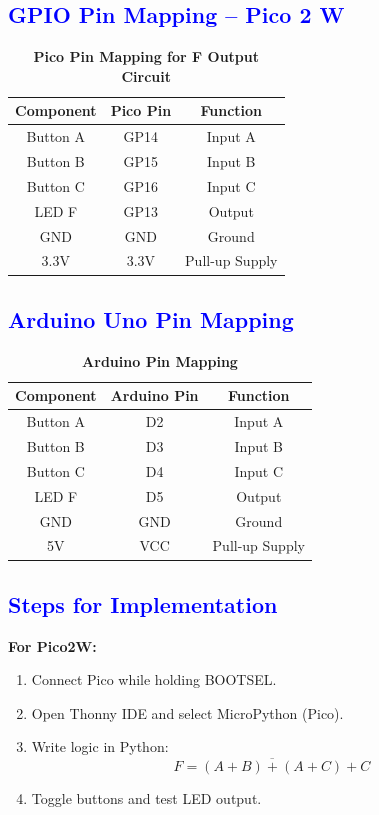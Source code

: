 \documentclass[twocolumn]{article}
\begin{document}
\subsection*{\textcolor{blue}{GPIO Pin Mapping – Pico 2 W}}

\begin{table}[h]
\centering
\renewcommand{\arraystretch}{1.3}
\begin{tabular}{|c|c|c|}
\hline
\textbf{Component} & \textbf{Pico Pin} & \textbf{Function} \\
\hline
Button A & GP14 & Input A \\
Button B & GP15 & Input B \\
Button C & GP16 & Input C \\
LED F & GP13 & Output \\
GND & GND & Ground \\
3.3V & 3.3V & Pull-up Supply \\
\hline
\end{tabular}
\caption*{\textbf{Pico Pin Mapping for F Output Circuit}}
\end{table}

\subsection*{\textcolor{blue}{Arduino Uno Pin Mapping}}

\begin{table}[h]
\centering
\renewcommand{\arraystretch}{1.3}
\begin{tabular}{|c|c|c|}
\hline
\textbf{Component} & \textbf{Arduino Pin} & \textbf{Function} \\
\hline
Button A & D2 & Input A \\
Button B & D3 & Input B \\
Button C & D4 & Input C \\
LED F & D5 & Output \\
GND & GND & Ground \\
5V & VCC & Pull-up Supply \\
\hline
\end{tabular}
\caption*{\textbf{Arduino Pin Mapping}}
\end{table}

\subsection*{\textcolor{blue}{Steps for Implementation}}

\textbf{For Pico2W:}
\begin{enumerate}
    \item Connect Pico while holding BOOTSEL.
    \item Open Thonny IDE and select MicroPython (Pico).
    \item Write logic in Python:
    \[
    F = \overline{(A + B) + (A + C)} + C
    \]
    \item Toggle buttons and test LED output.
\end{enumerate}
\end{document}
